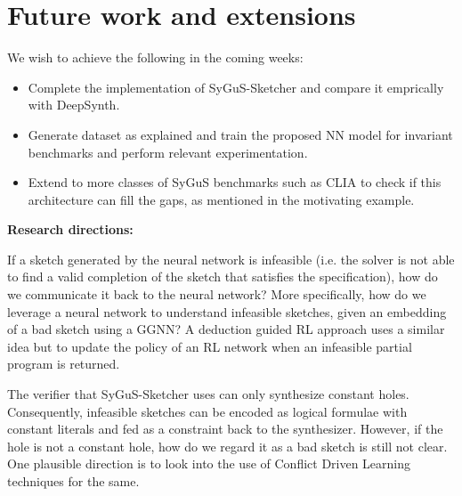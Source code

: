 \section{Future work and extensions}

\noindent We wish to achieve the following in the coming weeks:

\begin{itemize}
\item Complete the implementation of SyGuS-Sketcher and compare it emprically with DeepSynth.
\item Generate dataset as explained and train the proposed NN model for invariant benchmarks and perform relevant experimentation.
\item Extend to more classes of SyGuS benchmarks such as CLIA to check if this architecture can fill the gaps, as mentioned in the motivating example.
\end{itemize} 
\smallskip
\noindent\textbf{Research directions: }

If a sketch generated by the neural network is infeasible (i.e. the solver is not able to find a valid completion of the sketch that satisfies the specification), how do we communicate it back to the neural network? More specifically, how do we leverage a neural network to understand infeasible sketches, given an embedding of a bad sketch using a GGNN?  A deduction guided RL approach \cite{chenprogram} uses a similar idea but to update the policy of an RL network when an infeasible partial program is returned.
 
The verifier that SyGuS-Sketcher uses can only synthesize constant holes. Consequently, infeasible sketches can be encoded as logical formulae with constant literals and fed as a constraint back to the synthesizer. However, if the hole is not a constant hole, how do we regard it as a bad sketch is still not clear. One plausible direction is to look into the use of Conflict Driven Learning techniques for the same.